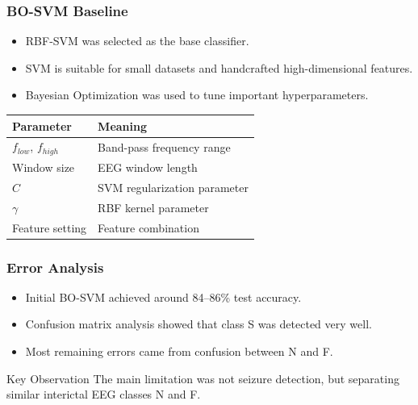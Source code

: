 \documentclass{beamer}
\begin{document}
\begin{frame}
\frametitle{BO-SVM Baseline}
\begin{itemize}
\item RBF-SVM was selected as the base classifier.
\item SVM is suitable for small datasets and handcrafted high-dimensional features.
\item Bayesian Optimization was used to tune important hyperparameters.
\end{itemize}

\begin{table}
\centering
\begin{tabular}{ll}
\toprule
Parameter & Meaning\\
\midrule
$f_{low}$, $f_{high}$ & Band-pass frequency range\\
Window size & EEG window length\\
$C$ & SVM regularization parameter\\
$\gamma$ & RBF kernel parameter\\
Feature setting & Feature combination\\
\bottomrule
\end{tabular}
\end{table}
\end{frame}

\begin{frame}
\frametitle{Error Analysis}
\begin{itemize}
\item Initial BO-SVM achieved around 84--86\% test accuracy.
\item Confusion matrix analysis showed that class S was detected very well.
\item Most remaining errors came from confusion between N and F.
\end{itemize}

\begin{block}{Key Observation}
The main limitation was not seizure detection, but separating similar interictal EEG classes N and F.
\end{block}
\end{frame}
\end{document}
